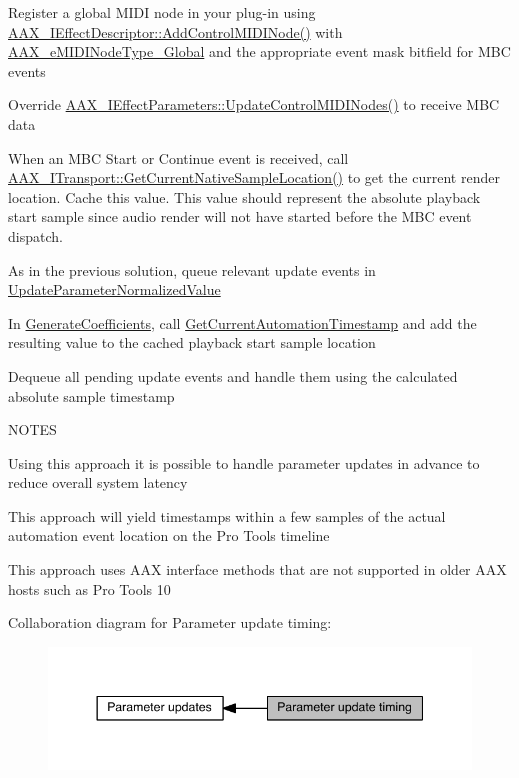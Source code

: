 \begin{DoxyEnumerate}
\item Register a global M\+I\+D\+I node in your plug-\/in using \hyperlink{a00096_aa7709de005e0256feb522758ccc5b582}{A\+A\+X\+\_\+\+I\+Effect\+Descriptor\+::\+Add\+Control\+M\+I\+D\+I\+Node()} with \hyperlink{a00206_a5e1dffce35d05990dbbad651702678e4a2be91828f8c1dac20ab5dff136fc1fce}{A\+A\+X\+\_\+e\+M\+I\+D\+I\+Node\+Type\+\_\+\+Global} and the appropriate event mask bitfield for M\+B\+C events  
\item Override \hyperlink{a00062_ab4ec161f64086070083c21b566354861}{A\+A\+X\+\_\+\+I\+Effect\+Parameters\+::\+Update\+Control\+M\+I\+D\+I\+Nodes()} to receive M\+B\+C data  
\item When an M\+B\+C Start or Continue event is received, call \hyperlink{a00116_a8119233b03774528ffaa519771d792a0}{A\+A\+X\+\_\+\+I\+Transport\+::\+Get\+Current\+Native\+Sample\+Location()} to get the current render location. Cache this value. This value should represent the absolute playback start sample since audio render will not have started before the M\+B\+C event dispatch.  
\item As in the previous solution, queue relevant update events in \hyperlink{a00061_a685858711efb8634ce66c327f2865c71}{Update\+Parameter\+Normalized\+Value}  
\item In \hyperlink{a00061_a083265b008921b6114ede387711694b7}{Generate\+Coefficients}, call \hyperlink{a00090_af9ab9b228023e116f89249a56c27a20f}{Get\+Current\+Automation\+Timestamp} and add the resulting value to the cached playback start sample location  
\item Dequeue all pending update events and handle them using the calculated absolute sample timestamp  
\end{DoxyEnumerate}

N\+O\+T\+E\+S \begin{DoxyItemize}
\item Using this approach it is possible to handle parameter updates in advance to reduce overall system latency \item This approach will yield timestamps within a few samples of the actual automation event location on the Pro Tools timeline \item This approach uses A\+A\+X interface methods that are not supported in older A\+A\+X hosts such as Pro Tools 10 \end{DoxyItemize}
Collaboration diagram for Parameter update timing\+:
\nopagebreak
\begin{figure}[H]
\begin{center}
\leavevmode
\includegraphics[width=344pt]{a00351}
\end{center}
\end{figure}
